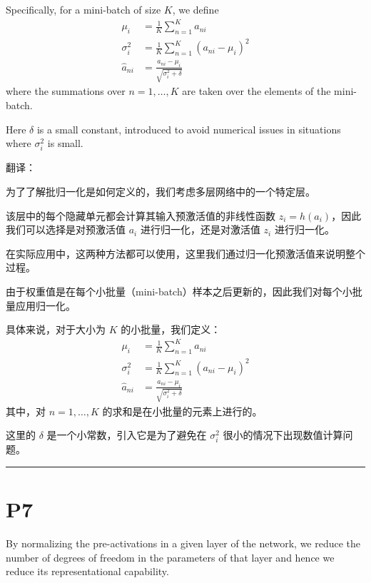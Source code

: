 \documentclass{article}
\begin{document}
Specifically, for a mini-batch of size $K$, we define
\begin{align}
    \mu_i &= \frac{1}{K} \sum_{n=1}^K a_{ni} \tag{7.52} \\
    \sigma_i^2 &= \frac{1}{K} \sum_{n=1}^K (a_{ni} - \mu_i)^2 \tag{7.53} \\
    \widehat{a}_{ni} &= \frac{a_{ni} - \mu_i}{\sqrt{\sigma_i^2 + \delta}} \tag{7.54}
\end{align}
where the summations over $n = 1, \dots, K$ are taken over the elements of the mini-batch. 

Here $\delta$ is a small constant, introduced to avoid numerical issues in situations where $\sigma_i^2$ is small.

{\color{red}
翻译：

为了了解批归一化是如何定义的，我们考虑多层网络中的一个特定层。

该层中的每个隐藏单元都会计算其输入预激活值的非线性函数 $z_i = h(a_i)$，因此我们可以选择是对预激活值 $a_i$ 进行归一化，还是对激活值 $z_i$ 进行归一化。

在实际应用中，这两种方法都可以使用，这里我们通过归一化预激活值来说明整个过程。

由于权重值是在每个小批量（mini-batch）样本之后更新的，因此我们对每个小批量应用归一化。

具体来说，对于大小为 $K$ 的小批量，我们定义：
\begin{align}
    \mu_i &= \frac{1}{K} \sum_{n=1}^K a_{ni} \tag{7.52} \\
    \sigma_i^2 &= \frac{1}{K} \sum_{n=1}^K (a_{ni} - \mu_i)^2 \tag{7.53} \\
    \widehat{a}_{ni} &= \frac{a_{ni} - \mu_i}{\sqrt{\sigma_i^2 + \delta}} \tag{7.54}
\end{align}
其中，对 $n = 1, \dots, K$ 的求和是在小批量的元素上进行的。

这里的 $\delta$ 是一个小常数，引入它是为了避免在 $\sigma_i^2$ 很小的情况下出现数值计算问题。

}

\noindent\rule{\linewidth}{0.4pt}

\section{P7}

By normalizing the pre-activations in a given layer of the network, we reduce the number of degrees of freedom in the parameters of that layer and hence we reduce its representational capability. 
\end{document}
